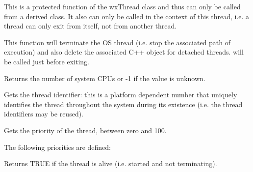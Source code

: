 \label{wxthreadexit}


This is a protected function of the wxThread class and thus can only be called
from a derived class. It also can only be called in the context of this
thread, i.e. a thread can only exit from itself, not from another thread.

This function will terminate the OS thread (i.e. stop the associated path of
execution) and also delete the associated C++ object for detached threads. 
 will be called just before exiting.

\label{wxthreadgetcpucount}


Returns the number of system CPUs or -1 if the value is unknown.



\label{wxthreadgetid}


Gets the thread identifier: this is a platform dependent number that uniquely identifies the
thread throughout the system during its existence (i.e. the thread identifiers may be reused).

\label{wxthreadgetpriority}


Gets the priority of the thread, between zero and 100.

The following priorities are defined:

\twocolwidtha{7cm}
\begin{twocollist}\itemsep=0pt
\end{twocollist}

\label{wxthreadisalive}


Returns TRUE if the thread is alive (i.e. started and not terminating).

\label{wxthreadisdetached}

